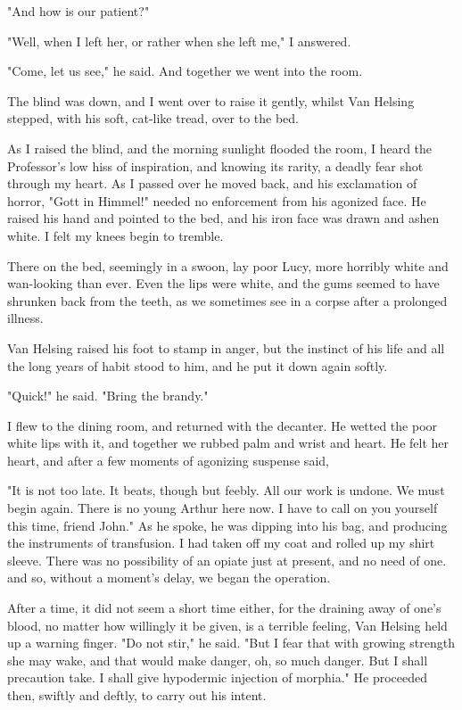 "And how is our patient?" 

"Well, when I left her, or rather when she left me," I answered. 

"Come, let us see," he said. And together we went into the room. 

The blind was down, and I went over to raise it gently, whilst Van Helsing stepped, with his soft, cat-like tread, over to the bed. 

As I raised the blind, and the morning sunlight flooded the room, I heard the Professor's low hiss of inspiration, and knowing its rarity, a deadly fear shot through my heart. As I passed over he moved back, and his exclamation of horror, "Gott in Himmel!" needed no enforcement from his agonized face. He raised his hand and pointed to the bed, and his iron face was drawn and ashen white. I felt my knees begin to tremble. 

There on the bed, seemingly in a swoon, lay poor Lucy, more horribly white and wan-looking than ever. Even the lips were white, and the gums seemed to have shrunken back from the teeth, as we sometimes see in a corpse after a prolonged illness. 

Van Helsing raised his foot to stamp in anger, but the instinct of his life and all the long years of habit stood to him, and he put it down again softly. 

"Quick!" he said. "Bring the brandy." 

I flew to the dining room, and returned with the decanter. He wetted the poor white lips with it, and together we rubbed palm and wrist and heart. He felt her heart, and after a few moments of agonizing suspense said, 

"It is not too late. It beats, though but feebly. All our work is undone. We must begin again. There is no young Arthur here now. I have to call on you yourself this time, friend John." As he spoke, he was dipping into his bag, and producing the instruments of transfusion. I had taken off my coat and rolled up my shirt sleeve. There was no possibility of an opiate just at present, and no need of one. and so, without a moment's delay, we began the operation. 

After a time, it did not seem a short time either, for the draining away of one's blood, no matter how willingly it be given, is a terrible feeling, Van Helsing held up a warning finger. "Do not stir," he said. "But I fear that with growing strength she may wake, and that would make danger, oh, so much danger. But I shall precaution take. I shall give hypodermic injection of morphia." He proceeded then, swiftly and deftly, to carry out his intent. 

